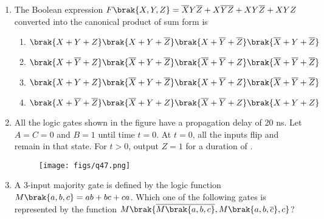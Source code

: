 \documentclass[a4paper, 11pt]{article}
\begin{document}
\begin{enumerate}
    \hfill{}

    \item The Boolean expression $F\brak{X,Y,Z}=\overline{X}Y\overline{Z}+X\overline{Y}\overline{Z}+X Y\overline{Z}+XYZ$ converted into the canonical product of sum  form is
    \begin{enumerate}
        \item $\brak{X+Y+Z}\brak{X+Y+\overline{Z}}\brak{X+\overline{Y}+\overline{Z}}\brak{\overline{X}+Y+\overline{Z}}$
        \item $\brak{X+\overline{Y}+Z}\brak{\overline{X}+Y+\overline{Z}}\brak{\overline{X}+\overline{Y}+Z}\brak{\overline{X}+\overline{Y}+\overline{Z}}$
        \item $\brak{X+Y+Z}\brak{\overline{X}+Y+\overline{Z}}\brak{X+\overline{Y}+Z}\brak{\overline{X}+\overline{Y}+\overline{Z}}$
        \item $\brak{X+\overline{Y}+\overline{Z}}\brak{\overline{X}+Y+Z}\brak{\overline{X}+\overline{Y}+Z}\brak{X+Y+Z}$
    \end{enumerate}
    
    \hfill{}

    \item All the logic gates shown in the figure have a propagation delay of 20 ns. Let $A=C=0$ and $B=1$ until time $t=0$. At $t=0$, all the inputs flip  and remain in that state. For $t>0$, output $Z=1$ for a duration  of \underline{\hspace{2cm}}.
    \begin{figure}[H]
        \centering
        \texttt{[image: figs/q47.png]}
        \caption*{}
        \label{fig:q47}
    \end{figure}
    
    \hfill{}

    \item A 3-input majority gate is defined by the logic function $M\brak{a,b,c}=ab+bc+ca$. Which one of the following gates is represented by the function $M\brak{\overline{M\brak{a,b,c}}, M\brak{a,b,\overline{c}},c}$?
    \begin{enumerate}
    \end{enumerate}
    

\end{enumerate}
\end{document}
